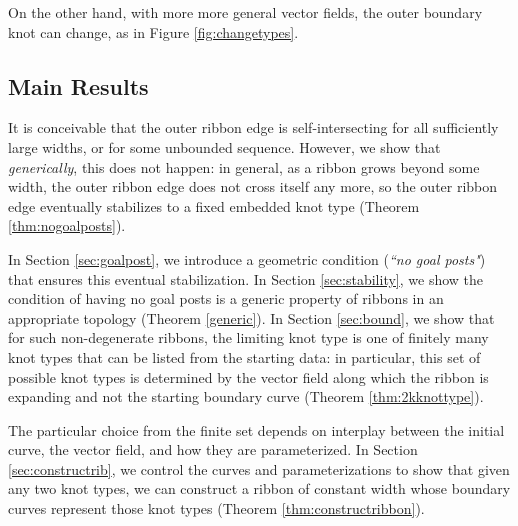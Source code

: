 \documentclass[12pt]{article}
\numberwithin{equation}{subsection}
\theoremstyle{definition}
\numberwithin{lem}{section}
\begin{document}
\begin{figure}[h]
\end{figure}

\begin{figure}[h]
\end{figure}

On the other hand, with more more general vector fields,  the outer boundary knot can change, as in Figure \ref{fig:changetypes}.


\subsection{Main Results}

It is conceivable that the outer ribbon edge is self-intersecting for all sufficiently large widths, or for some unbounded sequence. However, we show that {\em generically}, this does not happen: in general, as a ribbon grows beyond some width, the outer ribbon edge does not cross itself any more, so the outer ribbon edge eventually stabilizes to a fixed embedded knot type (Theorem \ref{thm:nogoalposts}).  

In Section \ref{sec:goalpost}, we introduce a geometric condition ({\em``no goal posts"})  that ensures this eventual stabilization.  In Section \ref{sec:stability}, we show the condition of having no goal posts is a generic property of ribbons in an appropriate topology (Theorem \ref{generic}).  In Section \ref{sec:bound}, we show that for such non-degenerate ribbons, the limiting knot type is one of finitely many knot types that can be listed from the starting data:  in particular, this set of possible knot types is determined by the vector field along which the ribbon is expanding and not the starting boundary curve (Theorem \ref{thm:2kknottype}).  

The particular choice from the finite set depends on interplay between the initial curve, the vector field, and how they are parameterized.  In Section \ref{sec:constructrib}, we control the curves and parameterizations to show that given any two knot types, we can construct a ribbon of constant width whose boundary curves represent those knot types (Theorem \ref{thm:constructribbon}). 
\end{document}
